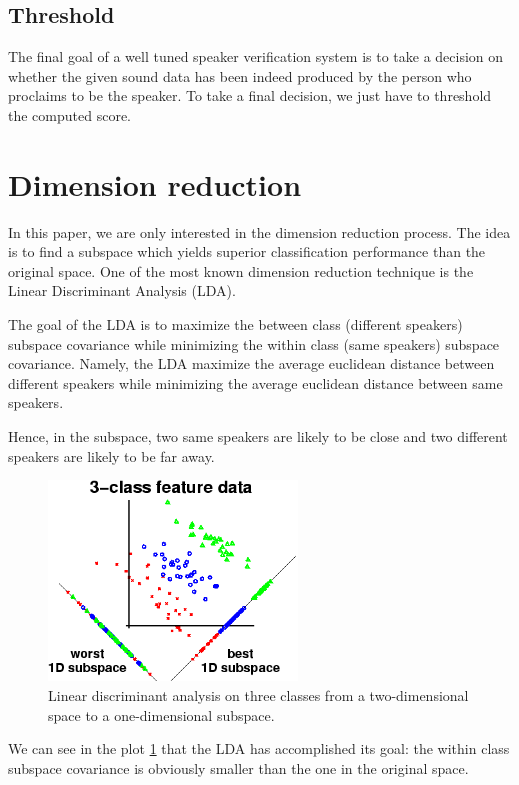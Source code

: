 \documentclass{techrep}
\begin{document}
\subsection{Threshold}

The final goal of a well tuned speaker verification system is to take a decision
on whether the given sound data has been indeed produced by the person who proclaims
to be the speaker.
To take a final decision, we just have to threshold the computed score.


\section{Dimension reduction}

In this paper, we are only interested in the dimension reduction
process. The idea is to find a subspace which yields superior
classification performance than the original space. One of the most
known dimension reduction technique is the Linear Discriminant
Analysis (LDA).

The goal of the LDA is to maximize the between class (different
speakers) subspace covariance while minimizing the within class (same
speakers) subspace covariance. Namely, the LDA maximize the average
euclidean distance between different speakers while minimizing the
average euclidean distance between same speakers.


Hence, in the subspace, two same speakers are likely to be close and two different
speakers are likely to be far away.

\begin{figure}[H]
  \centering
  \includegraphics[width=250px]{lda}
  \caption{Linear discriminant analysis on three classes from a two-dimensional space to a one-dimensional subspace.}
  \label{lda}
\end{figure}

We can see in the plot \ref{lda} that the LDA has accomplished its
goal: the within class subspace covariance is obviously smaller than
the one in the original space.
\end{document}
